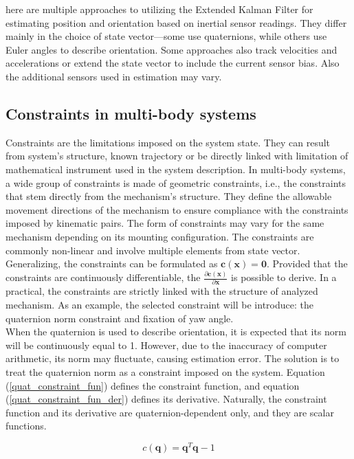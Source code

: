 here are multiple approaches to utilizing the Extended Kalman Filter for estimating position and orientation based on inertial sensor readings. They differ mainly in the choice of state vector---some use quaternions, while others use Euler angles to describe orientation. Some approaches also track velocities and accelerations or extend the state vector to include the current sensor bias. Also the additional sensors used in estimation may vary. 

\subsection{Constraints in multi-body systems}

Constraints are the limitations imposed on the system state. They can result from system’s structure, known trajectory or be directly linked with limitation of mathematical instrument used in the system description. In multi-body systems, a wide group of constraints is made of geometric constraints, i.e., the constraints that stem directly from the mechanism’s structure. They define the allowable movement directions of the mechanism to ensure compliance with the constraints imposed by kinematic pairs. The form of constraints may vary for the same mechanism depending on its mounting configuration. The constraints are commonly non-linear and involve multiple elements from state vector. Generalizing, the constraints can be formulated as $\bm{c}(\bm{x}) = \bm{0}$. Provided that the constraints are continuously differentiable, the $\frac{\partial \bm{c}(\bm{x})}{\partial \bm{x}}$ is possible to derive. In a practical, the constraints are strictly linked with the structure of analyzed mechanism. As an example,  the selected constraint will be introduce: the quaternion norm constraint and fixation of yaw angle. \\

When the quaternion is used to describe orientation, it is expected that its norm will be continuously equal to 1. However, due to the inaccuracy of computer arithmetic, its norm may fluctuate, causing estimation error.   The solution is to treat the quaternion norm  as a constraint imposed on the system. Equation (\ref{quat_constraint_fun}) defines the constraint function, and equation (\ref{quat_constraint_fun_der}) defines its derivative. Naturally, the constraint function and its derivative are quaternion-dependent only, and they are scalar functions.

\begin{equation}
	c \left( \bm{q} \right) = \bm{q}^T \bm{q} - 1
	\label{quat_constraint_fun}
\end{equation}

